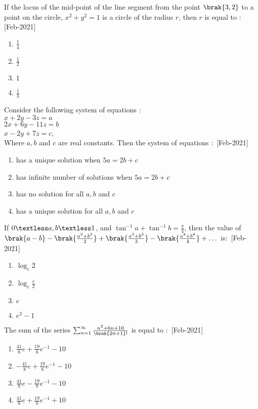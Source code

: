     \item If the locus of the mid-point of the line segment from the point $\brak{3, 2}$ to a point on the circle, $x^2 + y^2 = 1$ is a circle of the radius $r$, then $r$ is equal to $\colon$
    \hfill{[Feb-2021]}
        \begin{enumerate}
            \item $\frac{1}{4}$
            \item $\frac{1}{2}$
            \item $1$
            \item $\frac{1}{3}$
        \end{enumerate}
    \item Consider the following system of equations $\colon$\\
    $x + 2y - 3z = a$\\
    $2x + 6y - 11 z = b$\\
    $x - 2y + 7z = c$,\\
    Where $a, b$ and $c$ are real constants. Then the system of equations $\colon$
    \hfill{[Feb-2021]}
        \begin{enumerate}
            \item has a unique solution when $5a = 2b + c$
            \item has infinite number of solutions when $5a = 2b + c$ 
            \item has no solution for all $a, b$ and $c$ 
            \item has a unique solution for all $a, b$ and $c$ 
        \end{enumerate}
    \item If $0\textless a,b\textless 1$, and $\tan^{-1}{a}+\tan^{-1}{b}=\frac{\pi}{4}$, then the value of $\brak{a-b}-\brak{\frac{a^2+b^2}{2}}+\brak{\frac{a^3+b^3}{3}}-\brak{\frac{a^4+b^4}{4}}+\dots$ is$\colon$
    \hfill{[Feb-2021]}
        \begin{enumerate}
            \item $\log_{e}2$
            \item $\log_{e}\frac{e}{2}$
            \item $e$
            \item $e^2-1$
        \end{enumerate}
    \item The sum of the series $\sum_{n=1}^{\infty}\frac{n^2+6n+10}{\brak{2n+1}!}$ is equal to $\colon$
    \hfill{[Feb-2021]}
        \begin{enumerate}
            \item $\frac{41}{8}e+\frac{19}{8}e^{-1}-10$
            \item $-\frac{41}{8}e+\frac{19}{8}e^{-1}-10$
            \item $\frac{41}{8}e-\frac{19}{8}e^{-1}-10$
            \item $\frac{41}{8}e+\frac{19}{8}e^{-1}+10$
        \end{enumerate}
